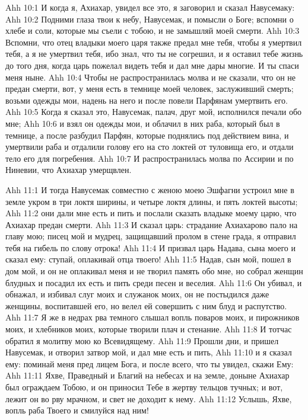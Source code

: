 \vs Ahh 10:1
И когда я, Ахиахар, увидел все это, я заговорил и сказал Навусемаку:
\vs Ahh 10:2
Подними глаза твои к небу, Навусемак, и помысли о Боге; вспомни о хлебе и соли, которые мы съели с тобою, и не замышляй моей смерти.
\vs Ahh 10:3
Вспомни, что отец владыки моего царя также предал мне тебя, чтобы я умертвил тебя, а я не умертвил тебя, ибо знал, что ты не согрешил, и я оставил тебе жизнь до того дня, когда царь пожелал видеть тебя и дал мне дары многие. И ты спаси меня ныне.
\vs Ahh 10:4
Чтобы не распространилась молва и не сказали, что он не предан смерти, вот, у меня есть в темнице моей человек, заслуживший смерть; возьми одежды мои, надень на него и после повели Парфянам умертвить его.
\vs Ahh 10:5
Когда я сказал это, Навусемак, палач, друг мой, исполнился печали обо мне;
\vs Ahh 10:6
и взял он одежды мои, и облачил в них раба, который был в темнице, а после разбудил Парфян, которые поднялись под действием вина, и умертвили раба и отдалили голову его на сто локтей от туловища его, и отдали тело его для погребения.
\vs Ahh 10:7
И распространилась молва по Ассирии и по Ниневии, что Ахиахар умерщвлен.

\vs Ahh 11:1
И тогда Навусемак совместно с женою моею Эшфагни устроил мне в земле укром в три локтя ширины, и четыре локтя длины, и пять локтей высоты;
\vs Ahh 11:2
они дали мне есть и пить и послали сказать владыке моему царю, что Ахиахар предан смерти.
\vs Ahh 11:3
И сказал царь: страдание Ахиахарово пало на главу мою; писец мой и мудрец, защищавший пролом в стене града, я отправил тебя на гибель по слову отрока!
\vs Ahh 11:4
И призвал царь Надава, сына моего и сказал ему: ступай, оплакивай отца твоего!
\vs Ahh 11:5
Надав, сын мой, пошел в дом мой, и он не оплакивал меня и не творил память обо мне, но собрал женщин блудных и посадил их есть и пить среди песен и веселия.
\vs Ahh 11:6
Он убивал, и обнажал, и избивал слуг моих и служанок моих, он не постыдился даже женщины, воспитавшей его, но велел ей совершить с ним блуд и распутство.
\vs Ahh 11:7
Я же в недрах рва темного слышал вопль поваров моих, и пирожников моих, и хлебников моих, которые творили плач и стенание.
\vs Ahh 11:8
И тотчас обратил я молитву мою ко Всевидящему.
\vs Ahh 11:9
Прошли дни, и пришел Навусемак, и отворил затвор мой, и дал мне есть и пить,
\vs Ahh 11:10
и я сказал ему: поминай меня пред лицем Бога, и после всего, что ты увидел, скажи Ему:
\vs Ahh 11:11
Яхве, Праведный и Благий на небесах и на земле, доныне Ахиахар был ограждаем Тобою, и он приносил Тебе в жертву тельцов тучных; и вот, лежит он во рву мрачном, и свет не доходит к нему.
\vs Ahh 11:12
Услышь, Яхве, вопль раба Твоего и смилуйся над ним!

